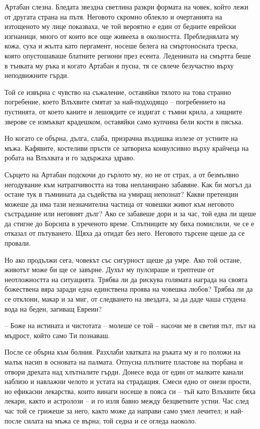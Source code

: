Артабан слезна. Бледата звездна светлина разкри формата на човек, който лежи от
другата страна на пътя. Неговото скромно облекло и очертанията на изтощеното му
лице показваха, че той вероятно е един от бедните еврейски изгнаници, много от
които все още живееха в околността. Пребледнялата му кожа, суха и жълта като
пергамент, носеше белега на смъртоносната треска, която опустошаваше блатните
региони през есента. Леденината на смъртта беше в тънката му ръка и когато
Артабан я пусна, тя се свлече безучастно върху неподвижните гърди.

Той се извърна с чувство на съжаление, оставяйки тялото на това странно
погребение, което Влъхвите смятат за най-подходящо -- погребението на пустинята,
от което каните и лешоядите се издигат с тъмни крила, а хищните зверове се
измъкват крадешком, оставяйки само купчина бели кости в пясъка.

Но когато се обърна, дълга, слаба, призрачна въздишка излезе от устните на мъжа.
Кафявите, костеливи пръсти се затвориха конвулсивно върху крайчеца на робата на
Влъхвата и го задържаха здраво.

Сърцето на Артабан подскочи до гърлото му, но не от страх, а от безмълвно
негодувание към натрапчивостта на това непланирано забавяне. Как би могъл да
остане тук в тъмнината да съдейства на умиращ непознат? Какви претенции можеше
да има тази незначителна частица от човешки живот към неговото състрадание или
неговият дълг? Ако се забавеше дори и за час, той едва ли щеше да стигне до
Борсипа в уреченото време. Спътниците му биха помислили, че се е отказал от
пътуването. Щяха да отидат без него. Неговото търсене щеше да се провали.

Но ако продължи сега, човекът със сигурност щеше да умре. Ако той остане,
животът може би ще се завърне. Духът му пулсираше и трептеше от неотложността на
ситуацията. Трябва ли да рискува голямата награда на своята божествена вяра
заради една единствена проява на човешка любов? Трябва ли да се отклони, макар и
за миг, от следването на звездата, за да даде чаша студена вода на беден,
загиващ Евреин?

-- Боже на истината и чистотата -- молеше се той -- насочи ме в светия път, път
на мъдрост, който само Ти познаваш.

После се обърна към болния. Разхлаби хватката на ръката му и го положи на малък
насип в основата на палмата. Отпусна плътните пластове на тюрбана и отвори
дрехата над хлътналите гърди. Донесе вода от един от малките канали наблизо и
навлажни челото и устата на страдащия. Смеси едно от онези прости, но ефикасни
лекарства, които винаги носеше в пояса си -- тъй като Влъхвите бяха лекари,
както и астролози -- и го изля бавно между безцветните устни. Час след час той
се грижеше за него, както може да направи само умел лечител; и най-после силата
на мъжа се върна; той седна и се огледа наоколо.

